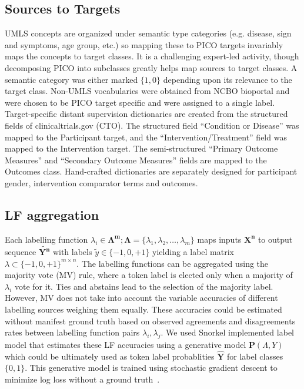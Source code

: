 \documentclass[10.7pt,]{article}
\begin{document}
\subsection{Sources to Targets}\label{s2t}
%
UMLS concepts are organized under semantic type categories (e.g. disease, sign and symptoms, age group, etc.) so mapping these to PICO targets invariably maps the concepts to target classes. 
It is a challenging expert-led activity, though decomposing PICO into subclasses greatly helps map sources to target classes.
A semantic category was either marked $\{1, 0\}$ depending upon its relevance to the target class.
Non-UMLS vocabularies were obtained from NCBO bioportal and were chosen to be PICO target specific and were assigned to a single label.
Target-specific distant supervision dictionaries are created from the structured fields of clinicaltrials.gov (CTO). 
The structured field ``Condition or Disease'' was mapped to the Participant target, and the ``Intervention/Treatment'' field was mapped to the Intervention target.
The semi-structured ``Primary Outcome Measures'' and ``Secondary Outcome Measures'' fields are mapped to the Outcomes class.
Hand-crafted dictionaries are separately designed for participant gender, intervention comparator terms and outcomes.
%
%
%
\subsection{LF aggregation}\label{lms}
%
Each labelling function $ \lambda_{i} \in \bm{\Lambda^{m}}; \bm{\Lambda} = \{\lambda_{1}, \lambda_{2}, \dotso, \lambda_{m} \} $ maps inputs $\bm{X^{n}}$ to output sequence $ \widetilde{\bm{Y^{n}}}$ with labels $\widetilde{y} \in \{-1, 0, +1\}$ yielding a label matrix $ \lambda \subset \{-1, 0, +1\}^{m \times n}$.
The labelling functions can be aggregated using the majority vote (MV) rule, where a token label is elected only when a majority of $\lambda_{i}$ vote for it. 
Ties and abstains lead to the selection of the majority label.
However, MV does not take into account the variable accuracies of different labelling sources weighing them equally.
These accuracies could be estimated without manifest ground truth based on observed agreements and disagreements rates between labelling function pairs $ \lambda_{i}, \lambda_{j}$.
We used Snorkel implemented label model that estimates these LF accuracies using a generative model $ \bm{P} ( \Lambda , Y )$ which could be ultimately used as token label probablities $\bm{\hat{Y}}$ for label classes $ \{ 0, 1\} $.
This generative model is trained using stochastic gradient descent to minimize log loss without a ground truth~\cite{ratner2017snorkel}.
%
%
%
\end{document}
